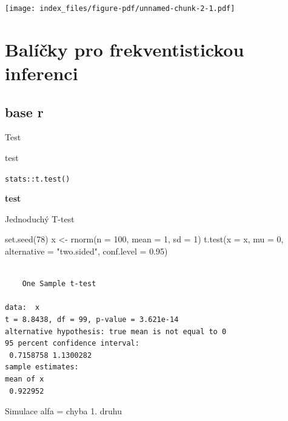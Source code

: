\documentclass[
  11pt,
  a4paper]{report}
\newenvironment{Shaded}{\begin{snugshade}}{\end{snugshade}}
\newcommand{\AttributeTok}[1]{\textcolor[rgb]{0.40,0.45,0.13}{#1}}
\newcommand{\DecValTok}[1]{\textcolor[rgb]{0.68,0.00,0.00}{#1}}
\newcommand{\FloatTok}[1]{\textcolor[rgb]{0.68,0.00,0.00}{#1}}
\newcommand{\FunctionTok}[1]{\textcolor[rgb]{0.28,0.35,0.67}{#1}}
\newcommand{\NormalTok}[1]{\textcolor[rgb]{0.00,0.23,0.31}{#1}}
\newcommand{\OtherTok}[1]{\textcolor[rgb]{0.00,0.23,0.31}{#1}}
\newcommand{\StringTok}[1]{\textcolor[rgb]{0.13,0.47,0.30}{#1}}
\begin{document}
\texttt{[image: index\_files/figure-pdf/unnamed-chunk-2-1.pdf]}

\section{Balíčky pro frekventistickou
inferenci}\label{baluxedux10dky-pro-frekventistickou-inferenci}

\subsection{base r}\label{base-r}

Test

test

\texttt{stats::t.test()}

\textbf{test}

Jednoduchý T-test

\begin{Shaded}
\begin{Highlighting}[]
\FunctionTok{set.seed}\NormalTok{(}\DecValTok{78}\NormalTok{)}
\NormalTok{x }\OtherTok{\textless{}{-}} \FunctionTok{rnorm}\NormalTok{(}\AttributeTok{n =} \DecValTok{100}\NormalTok{, }\AttributeTok{mean =} \DecValTok{1}\NormalTok{, }\AttributeTok{sd =} \DecValTok{1}\NormalTok{)}
\FunctionTok{t.test}\NormalTok{(}\AttributeTok{x =}\NormalTok{ x, }\AttributeTok{mu =} \DecValTok{0}\NormalTok{,}
       \AttributeTok{alternative =} \StringTok{"two.sided"}\NormalTok{, }\AttributeTok{conf.level =} \FloatTok{0.95}\NormalTok{)}
\end{Highlighting}
\end{Shaded}

\begin{verbatim}

    One Sample t-test

data:  x
t = 8.8438, df = 99, p-value = 3.621e-14
alternative hypothesis: true mean is not equal to 0
95 percent confidence interval:
 0.7158758 1.1300282
sample estimates:
mean of x 
 0.922952 
\end{verbatim}

Simulace alfa = chyba 1. druhu
\end{document}
